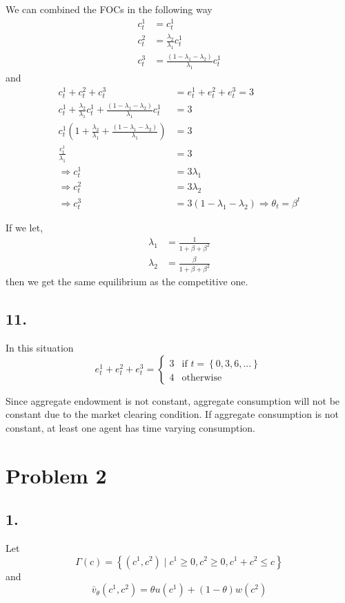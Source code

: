 \documentclass[12pt]{article}
\theoremstyle{definition}
\newcommand{\cbra}[1]{\left\{#1\right\}}
\newcommand{\mat}[1]{\begin{matrix}#1\end{matrix}}
\begin{document}
We can combined the FOCs in the following way
\begin{align*}
c_t^1 &= c_t^1 \\
c_t^2 &= \frac{\lambda_2}{\lambda_1}c_t^1 \\
c_t^3 &= \frac{(1-\lambda_1 -\lambda_2)}{\lambda_1}c_t^1
\end{align*}
and 
\begin{align*}
	c_t^1+c_t^2+c_t^3 & = e_t^1+e_t^2+e_t^3 =3\\
	c_t^1 + \frac{\lambda_2}{\lambda_1}c_t^1 +\frac{(1-\lambda_1 -\lambda_2)}{\lambda_1}c_t^1 & =3\\
	c_t^1 \left( 1+ \frac{\lambda_2}{\lambda_1} +\frac{(1-\lambda_1 -\lambda_2)}{\lambda_1}\right)  & =3\\
	\frac{c_t^1 }{\lambda_1} & = 3\\
	\Rightarrow  c_t^1 & = 3\lambda_1\\
	\Rightarrow c_t^2 & = 3\lambda_2 \\
	\Rightarrow  c_t^3  &= 3(1-\lambda_1 -\lambda_2)
	\Rightarrow \theta_t = \beta^t
\end{align*}

If we let,
\begin{align*}
	\lambda_1 &= \frac{1}{1+\beta+\beta^2}\\
	\lambda_2 &= \frac{\beta}{1+\beta+\beta^2}
\end{align*}
then we get the same equilibrium as the competitive one.

\subsection*{11.}

In this situation
\[
e_t^1+e_t^2+e_t^3 = \left\lbrace \mat{3 & \text{if }t=\cbra{0,3,6,...}\\ 4 & \text{otherwise}}\right. 
\]

Since aggregate endowment is not constant, aggregate consumption will not be constant due to the market clearing condition. If aggregate consumption is not constant, at least one agent has time varying consumption.
\section*{Problem 2}
\subsection*{1.}

Let 
\[
\Gamma(c)=\cbra{(c^1,c^2)\mid c^1\geq 0, c^2\geq 0, c^1+c^2\leq c}
\]
and
\[
\bar{v}_{\theta}(c^1,c^2)= \theta u(c^1)+(1-\theta)w(c^2)
\]
\end{document}
